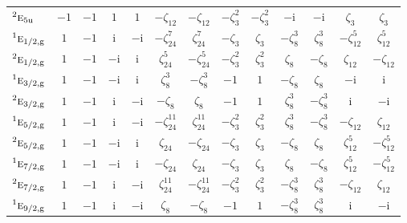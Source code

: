 \documentclass[10pt,a4paper]{article}
\makeatletter
\def\grouprule#1#2{\noalign{\marks\LTgroupmarks{\the\belowrulesep}\nobreak\vskip#1%
  \vskip\aboverulesep}\multispan\LT@cols\unskip{\leaders\hrule\@height#2\hfill\kern\z@}\cr
  \noalign{\penalty\LTrulebreak\vskip\belowrulesep\global\@lastruleclass\z@}}
\numberwithin{equation}{section}
\newcommand{\irr}[1]{\text{\normalfont\scshape #1}}
\newcommand{\conjpair}[1]{{}^{#1}}
\newcommand{\ptag}[1]{\mathrm{#1}}
\newcommand{\iunit}{\mathrm{i}}
\newcommand{\rootunity}[1]{\zeta_{#1}}
\makeatother
\begin{document}
{\begin{longtable}{@{}lcccccccccccc@{}}
$\conjpair{2}\irr{e}_{5\ptag{u}}$ & $-1$ & $-1$ & $1$ & $1$ & $-\rootunity{12}$ & $-\rootunity{12}$ & $-\rootunity{3}^{2}$ & $-\rootunity{3}^{2}$ & $-\iunit{}$ & $-\iunit{}$ & $\rootunity{3}$ & $\rootunity{3}$\\
\grouprule{0pt}{\lightrulewidth}
$\conjpair{1}\irr{e}_{1/2,\ptag{g}}$ & $1$ & $-1$ & $\iunit{}$ & $-\iunit{}$ & $-\rootunity{24}^{7}$ & $\rootunity{24}^{7}$ & $-\rootunity{3}$ & $\rootunity{3}$ & $-\rootunity{8}^{3}$ & $\rootunity{8}^{3}$ & $-\rootunity{12}^{5}$ & $\rootunity{12}^{5}$\\
$\conjpair{2}\irr{e}_{1/2,\ptag{g}}$ & $1$ & $-1$ & $-\iunit{}$ & $\iunit{}$ & $\rootunity{24}^{5}$ & $-\rootunity{24}^{5}$ & $-\rootunity{3}^{2}$ & $\rootunity{3}^{2}$ & $\rootunity{8}$ & $-\rootunity{8}$ & $\rootunity{12}$ & $-\rootunity{12}$\\
$\conjpair{1}\irr{e}_{3/2,\ptag{g}}$ & $1$ & $-1$ & $-\iunit{}$ & $\iunit{}$ & $\rootunity{8}^{3}$ & $-\rootunity{8}^{3}$ & $-1$ & $1$ & $-\rootunity{8}$ & $\rootunity{8}$ & $-\iunit{}$ & $\iunit{}$\\
$\conjpair{2}\irr{e}_{3/2,\ptag{g}}$ & $1$ & $-1$ & $\iunit{}$ & $-\iunit{}$ & $-\rootunity{8}$ & $\rootunity{8}$ & $-1$ & $1$ & $\rootunity{8}^{3}$ & $-\rootunity{8}^{3}$ & $\iunit{}$ & $-\iunit{}$\\
$\conjpair{1}\irr{e}_{5/2,\ptag{g}}$ & $1$ & $-1$ & $\iunit{}$ & $-\iunit{}$ & $-\rootunity{24}^{11}$ & $\rootunity{24}^{11}$ & $-\rootunity{3}^{2}$ & $\rootunity{3}^{2}$ & $\rootunity{8}^{3}$ & $-\rootunity{8}^{3}$ & $-\rootunity{12}$ & $\rootunity{12}$\\
$\conjpair{2}\irr{e}_{5/2,\ptag{g}}$ & $1$ & $-1$ & $-\iunit{}$ & $\iunit{}$ & $\rootunity{24}$ & $-\rootunity{24}$ & $-\rootunity{3}$ & $\rootunity{3}$ & $-\rootunity{8}$ & $\rootunity{8}$ & $\rootunity{12}^{5}$ & $-\rootunity{12}^{5}$\\
$\conjpair{1}\irr{e}_{7/2,\ptag{g}}$ & $1$ & $-1$ & $-\iunit{}$ & $\iunit{}$ & $-\rootunity{24}$ & $\rootunity{24}$ & $-\rootunity{3}$ & $\rootunity{3}$ & $\rootunity{8}$ & $-\rootunity{8}$ & $\rootunity{12}^{5}$ & $-\rootunity{12}^{5}$\\
$\conjpair{2}\irr{e}_{7/2,\ptag{g}}$ & $1$ & $-1$ & $\iunit{}$ & $-\iunit{}$ & $\rootunity{24}^{11}$ & $-\rootunity{24}^{11}$ & $-\rootunity{3}^{2}$ & $\rootunity{3}^{2}$ & $-\rootunity{8}^{3}$ & $\rootunity{8}^{3}$ & $-\rootunity{12}$ & $\rootunity{12}$\\
$\conjpair{1}\irr{e}_{9/2,\ptag{g}}$ & $1$ & $-1$ & $\iunit{}$ & $-\iunit{}$ & $\rootunity{8}$ & $-\rootunity{8}$ & $-1$ & $1$ & $-\rootunity{8}^{3}$ & $\rootunity{8}^{3}$ & $\iunit{}$ & $-\iunit{}$\\

\end{longtable}}
\end{document}
